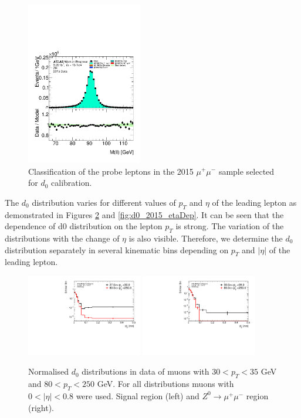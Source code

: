 \begin{figure}[htbp]
\centering
\includegraphics[width=0.45\textwidth]{figures/ZR/dataMc-dilep_m-ZR-mu.pdf}
\caption{
   Classification of the probe leptons in the 2015 $\mu^+\mu^-$ sample selected for $d_0$ calibration.
}
\label{fig:Zmumu_mass_composition}
\end{figure}

The $d_0$ distribution varies for different values of $p_T$ and $\eta$ of the leading lepton as demonstrated in Figures \ref{fig:d0_2015_pTDep} and \ref{fig:d0_2015_etaDep}. 
It can be seen that the dependence of d0 distribution on the lepton $p_T$ is strong.
The variation of the distributions with the change of $\eta$ is also visible.
Therefore, we determine the $d_0$ distribution separately in several kinematic bins depending on $p_T$ and $|\eta|$ of the leading lepton.

\begin{figure}[htbp]
\centering
\includegraphics[width=0.45\textwidth]{figures/ZR/d0_smearing/twoplots_TwoPlots_pT-fit_fabs_lep_0_trk_d0_cor-SR-mu.pdf}
\includegraphics[width=0.45\textwidth]{figures/ZR/d0_smearing/twoplots_TwoPlots_pT-fit_fabs_lep_0_trk_d0_cor-ZR-mu.pdf}
\caption{
  Normalised $d_0$ distributions in data of muons with $30 < p_T < 35$ GeV and $80 < p_T < 250$ GeV.
  For all distributions muons with $0 < |\eta| < 0.8$ were used.
  Signal region (left) and $Z^{0}\rightarrow\mu^{+}\mu^{-}$ region (right).
}
\label{fig:d0_2015_pTDep}
\end{figure}

